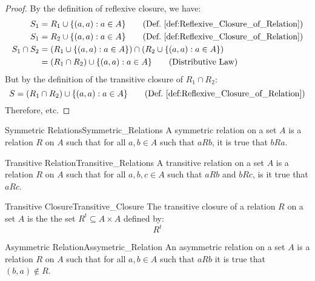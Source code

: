     \begin{proof}
        By the definition of reflexive closure, we have:
        \begin{align}
            S_{1}&=R_{1}\cup\{(a,a):a\in{A}\}
            \tag{Def.~\ref{def:Reflexive_Closure_of_Relation}}\\
            S_{1}&=R_{2}\cup\{(a,a):a\in{A}\}
            \tag{Def.~\ref{def:Reflexive_Closure_of_Relation}}\\
            \nonumber
            S_{1}\cap{S}_{2}&=
            (R_{1}\cup\{(a,a):a\in{A}\})
            \cap(R_{2}\cup\{(a,a):a\in{A}\})\\
            &=(R_{1}\cap{R}_{2})
            \cup\{(a,a):a\in{A}\}
            \tag{Distributive Law}
        \end{align}
        But by the definition of the transitive closure of
        $R_{1}\cap{R}_{2}$:
        \begin{equation}
            S=(R_{1}\cap{R}_{2})\cup\{(a,a):a\in{A}\}
            \tag{Def.~\ref{def:Reflexive_Closure_of_Relation}}
        \end{equation}
        Therefore, etc.
    \end{proof}
    \begin{fdefinition}{Symmetric Relations}{Symmetric_Relations}
        A symmetric relation on a set $A$ is a
        relation $R$ on $A$ such that for all $a,b\in{A}$
        such that $aRb$, it is true that $bRa$.
    \end{fdefinition}
    \begin{fdefinition}{Transitive Relation}{Transitive_Relations}
        A transitive relation on a set $A$ is a relation $R$ on $A$
        such that for all $a,b,c\in{A}$ such that $aRb$ and $bRc$,
        is it true that $aRc$.
    \end{fdefinition}
    \begin{fdefinition}{Transitive Closure}{Transitive_Closure}
        The transitive closure of a relation $R$ on a set
        $A$ is the the set $R^{t}\subseteq{A}\times{A}$ defined by:
        \begin{equation}
            R^{t}
        \end{equation}
    \end{fdefinition}
    \begin{fdefinition}{Asymmetric Relation}{Assymetric_Relation}
        An asymmetric relation on a set $A$ is a relation $R$
        on $A$ such that for all $a,b\in{A}$ such that $aRb$
        it is true that $(b,a)\notin{R}$.
    \end{fdefinition}
